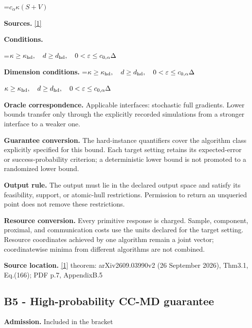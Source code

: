 \documentclass[10pt,a4paper]{article}
\newcommand{\AtlasMath}[1]{\par\begingroup\centering\setbox0=\hbox{$\displaystyle #1$}\ifdim\wd0>1.4\linewidth\typeout{ATLAS WIDE FORMULA: \the\wd0}\fi\ifdim\wd0>\linewidth\resizebox{\linewidth}{!}{\box0}\else\box0\fi\par\endgroup}
\newcommand{\AtlasInlineMath}[1]{\begingroup\setbox0=\hbox{$#1$}\ifdim\wd0>.4\linewidth\endgroup\AtlasMath{#1}\else\endgroup$#1$\fi}
\begin{document}
\AtlasMath{c_\alpha\kappa(S+V)}


\textbf{Sources.} \href{https://arxiv.org/pdf/2609.03990}{[1]}



\textbf{Conditions.}
\AtlasMath{\kappa\ge\kappa_{\rm hd},\quad d\ge d_{\rm hd},\quad0<\varepsilon\le c_{0,\alpha}\Delta}




\textbf{Dimension conditions.} \AtlasInlineMath{\kappa\ge\kappa_{\rm hd},\quad d\ge d_{\rm hd},\quad0<\varepsilon\le c_{0,\alpha}\Delta}



\textbf{Oracle correspondence.} Applicable interfaces: stochastic full gradients. Lower bounds transfer only through the explicitly recorded simulations from a stronger interface to a weaker one.



\textbf{Guarantee conversion.} The hard-instance quantifiers cover the algorithm class explicitly specified for this bound. Each target setting retains its expected-error or success-probability criterion; a deterministic lower bound is not promoted to a randomized lower bound.



\textbf{Output rule.} The output must lie in the declared output space and satisfy its feasibility, support, or atomic-hull restrictions. Permission to return an unqueried point does not remove these restrictions.



\textbf{Resource conversion.} Every primitive response is charged. Sample, component, proximal, and communication costs use the units declared for the target setting. Resource coordinates achieved by one algorithm remain a joint vector; coordinatewise minima from different algorithms are not combined.



\textbf{Source location.} \href{https://arxiv.org/pdf/2609.03990}{[1]} theorem: arXiv2609.03990v2 (26 September 2026), Thm3.1, Eq.(166); PDF p.7, AppendixB.5



\subsection{B5 - High-probability CC-MD guarantee}


\textbf{Admission.} Included in the bracket
\end{document}
